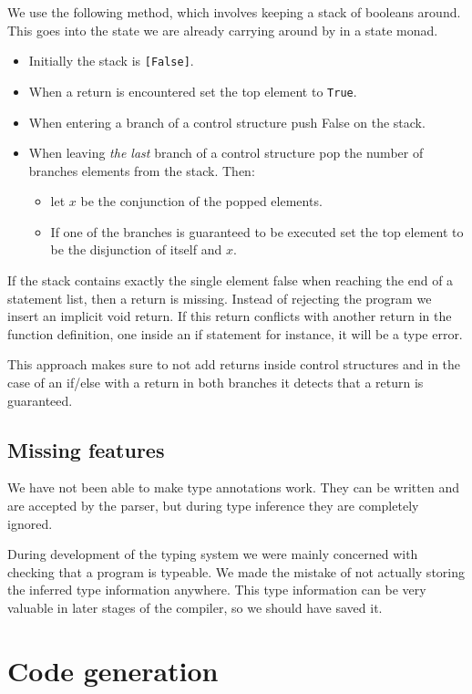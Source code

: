 \documentclass{scrartcl}
\begin{document}
We use the following method, which involves keeping a stack of booleans
around. This goes into the state we are already carrying around by
in a state monad.
\begin{itemize}
\item Initially the stack is \lstinline{[False]}.
\item When a return is encountered set the top element to \lstinline{True}.
\item When entering a branch of a control structure push False on the stack.
\item When leaving \emph{the last} branch of a control structure pop the number of branches elements from the stack. Then:
\begin{itemize}
  \item let $x$ be the conjunction of the popped elements.
  \item If one of the branches is guaranteed to be executed set the top element to be the disjunction of itself and $x$.
\end{itemize}
\end{itemize}
If the stack contains exactly the single element false when
reaching the end of a statement list, then a return is missing.
Instead of rejecting the program we insert an implicit void return.
If this return conflicts with another return in the function definition,
one inside an if statement for instance, it will be a type error.

This approach makes sure to not add returns inside control structures
and in the case of an if/else with a return in both branches it 
detects that a return is guaranteed.


\subsection{Missing features}
\label{sec:type:missing}
We have not been able to make type annotations work. They can be
written and are accepted by the parser, but during type inference
they are completely ignored.

During development of the typing system we were mainly concerned with
checking that a program is typeable. We made the mistake of not 
actually storing the inferred type information anywhere. This type
information can be very valuable in later stages of the compiler, so
we should have saved it.

\section{Code generation}
\end{document}
